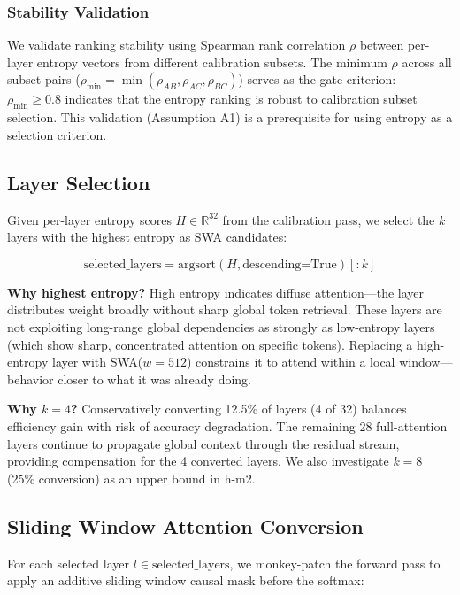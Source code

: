 \subsubsection{Stability Validation}

We validate ranking stability using Spearman rank correlation $\rho$ between per-layer entropy vectors from different calibration subsets. The minimum $\rho$ across all subset pairs ($\rho_{\min} = \min(\rho_{AB}, \rho_{AC}, \rho_{BC})$) serves as the gate criterion: $\rho_{\min} \geq 0.8$ indicates that the entropy ranking is robust to calibration subset selection. This validation (Assumption A1) is a prerequisite for using entropy as a selection criterion.

\subsection{Layer Selection}

Given per-layer entropy scores $H \in \mathbb{R}^{32}$ from the calibration pass, we select the $k$ layers with the highest entropy as SWA candidates:

\begin{equation}
\text{selected\_layers} = \text{argsort}(H, \text{descending=True})[:k]
\end{equation}

\textbf{Why highest entropy?} High entropy indicates diffuse attention---the layer distributes weight broadly without sharp global token retrieval. These layers are not exploiting long-range global dependencies as strongly as low-entropy layers (which show sharp, concentrated attention on specific tokens). Replacing a high-entropy layer with SWA($w=512$) constrains it to attend within a local window---behavior closer to what it was already doing.

\textbf{Why $k = 4$?} Conservatively converting 12.5\% of layers (4 of 32) balances efficiency gain with risk of accuracy degradation. The remaining 28 full-attention layers continue to propagate global context through the residual stream, providing compensation for the 4 converted layers. We also investigate $k = 8$ (25\% conversion) as an upper bound in h-m2.

\subsection{Sliding Window Attention Conversion}

For each selected layer $l \in \text{selected\_layers}$, we monkey-patch the forward pass to apply an additive sliding window causal mask before the softmax:

